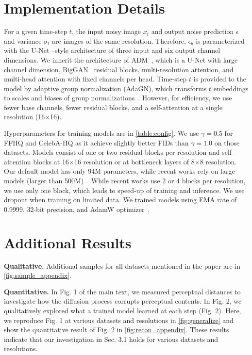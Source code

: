 \section{Implementation Details}

For a given time-step $t$, the input noisy image $x_t$ and output noise prediction $\epsilon$ and variance $\sigma _t$ are images of the same resolution. Therefore, $\epsilon _\theta$ is parameterized with the U-Net~\cite{ronneberger2015u}-style architecture of three input and six output channel dimensions. We inherit the architecture of ADM~\cite{dhariwal2021diffusion}, which is a U-Net with large channel dimension, BigGAN~\cite{brock2018large} residual blocks, multi-resolution attention, and multi-head attention with fixed channels per head. Time-step $t$ is provided to the model by adaptive group normalization (AdaGN), which transforms $t$ embeddings to scales and biases of group normalizations~\cite{wu2018group}. However, for efficiency, we use fewer base channels, fewer residual blocks, and a self-attention at a single resolution (16$\times$16). 

Hyperparameters for training models are in \cref{table:config}. We use $\gamma = 0.5$ for FFHQ and CelebA-HQ as it achieve slightly better FIDs than $\gamma = 1.0$ on those datasets. Models consist of one or two residual blocks per resolution and self-attention blocks at 16$\times$16 resolution or at bottleneck layers of 8$\times$8 resolution. Our default model has only 94M parameters, while recent works rely on large models (larger than 500M)~\cite{dhariwal2021diffusion}. While recent works use 2 or 4 blocks per resolution, we use only one block, which leads to speed-up of training and inference. We use dropout when training on limited data. We trained models using EMA rate of 0.9999, 32-bit precision, and AdamW optimizer~\cite{loshchilov2017decoupled}.



\section{Additional Results}
\textbf{Qualitative.  } Additional samples for all datasets mentioned in the paper are in \cref{fig:sample_appendix}.

\textbf{Quantitative.  } In Fig. 1 of the main text, we measured perceptual distances to investigate how the diffusion process corrupts perceptual contents. In Fig. 2, we qualitatively explored what a trained model learned at each step (Fig. 2). Here, we reproduce Fig. 1 at various datasets and resolutions in \cref{fig:generalize} and show the quantitative result of Fig. 2 in \cref{fig:recon_appendix}. These results indicate that our investigation in Sec. 3.1 holds for various datasets and resolutions.

